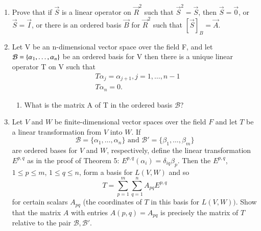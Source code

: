\begin{enumerate}[label=\thesubsection.\arabic*.,ref=\thesubsection.\theenumi]
\item Prove that if $\vec{S}$ is a linear operator on $\vec{R}^2$ such that $\vec{S}^2=\vec{S}$, 
then $\vec{S}=\vec{0}$, or $\vec{S}=\vec{I}$, or there is an ordered basis $\vec{B}$ for $\vec{R}^2$ 
such that $[\vec{S}]_B=\vec{A}$.
%
\\
\solution

\item Let V be an n-dimensional vector space over the field F, and let $\mathcal{B} = \left\{\alpha_1,\ldots, \alpha_n\right\}$ be an ordered basis for V then there is a unique linear operator T on V such that 
\begin{align}
   &T\alpha_{j} = \alpha_{j+1},  j=1,\ldots,n-1 \\
   &T\alpha_n = 0. 
\end{align}
%
\begin{enumerate}
\item What is the matrix A of T in the ordered basis $\mathcal{B}$?
\\
\solution

\end{enumerate}
\item Let $V$ and $W$ be finite-dimensional vector spaces over the field $F$ and let $T$ be a linear transformation from $V$ into $W$. If
\begin{equation}
	\mathcal{B} = \{\alpha_1, \dots, \alpha_n\} \text{ and } \mathcal{B}' = \{\beta_1, \dots, \beta_m\}
\end{equation}
are ordered bases for $V$ and $W$, respectively, define the linear transformation $E^{p,q}$ as in the proof of Theorem 5: $E^{p,q}(\alpha_i) = \delta_{iq}\beta_p$. Then the $E^{p,q}$, $1 \leq p \leq m$, $1 \leq q \leq n$, form a basis for $L(V,W)$ and so
\begin{equation}
	T = \displaystyle \sum_{p=1}^m \displaystyle \sum_{q=1}^n A_{pq}E^{p,q}
\end{equation} 
for certain scalars $A_{pq}$ (the coordinates of $T$ in this basis for $L(V,W))$. Show that the matrix $A$ with entries $A(p,q) = A_{pq}$ is precisely the matrix of $T$ relative to the pair $\mathcal{B},\mathcal{B}'$.
%
\\
\solution


\end{enumerate}
